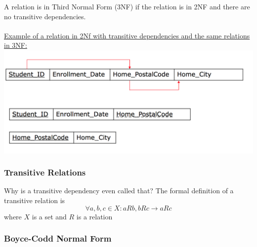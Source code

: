 \documentclass[12pt]{article}
\begin{document}
A relation is in Third Normal Form (3NF) if the relation is in 2NF and there are no transitive dependencies.\\
\\
\underline{Example of a relation in 2Nf with transitive dependencies and the same relations in 3NF:}\\
\includegraphics[scale=0.7]{lec6-4}

\subsubsection{Transitive Relations}

Why is a transitive dependency even called that? The formal definition of a transitive relation is $$\forall a,b,c \in X : aRb, bRc \longrightarrow aRc$$
where $X$ is a set and $R$ is a relation

\subsubsection{Boyce-Codd Normal Form}
\end{document}
